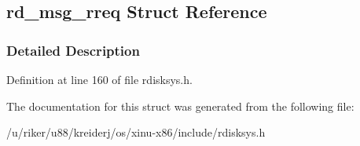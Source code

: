 \hypertarget{structrd__msg__rreq}{}\subsection{rd\+\_\+msg\+\_\+rreq Struct Reference}
\label{structrd__msg__rreq}


\subsubsection{Detailed Description}


Definition at line 160 of file rdisksys.\+h.



The documentation for this struct was generated from the following file\+:\begin{DoxyCompactItemize}
\item 
/u/riker/u88/kreiderj/os/xinu-\/x86/include/rdisksys.\+h\end{DoxyCompactItemize}
